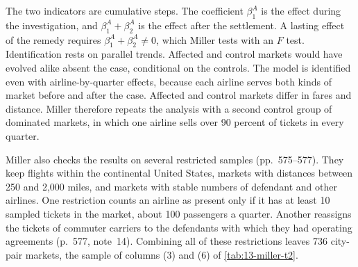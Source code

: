 The two indicators are cumulative steps. The coefficient $\beta^{A}_1$ is the effect during the investigation, and
$\beta^{A}_1 + \beta^{A}_2$ is the effect after the settlement. A lasting effect of the remedy requires
$\beta^{A}_1 + \beta^{A}_2 \neq 0$, which Miller tests with an $F$ test. Identification rests on parallel trends.
Affected and control markets would have evolved alike absent the case, conditional on the controls. The model is
identified even with airline-by-quarter effects, because each airline serves both kinds of market before and after
the case. Affected and control markets differ in fares and distance. Miller therefore repeats the analysis with a second
control group of dominated markets, in which one airline sells over 90 percent of tickets in every quarter.

Miller also checks the results on several restricted samples (pp.~575--577). They keep flights within the
continental United States, markets with distances between 250 and 2,000 miles, and markets with stable numbers of
defendant and other airlines. One restriction counts an airline as present only if it has at least 10 sampled
tickets in the market, about 100 passengers a quarter. Another reassigns the tickets of commuter carriers to the
defendants with which they had operating agreements (p.~577, note~14). Combining all of these restrictions leaves
736 city-pair markets, the sample of columns (3) and (6) of \cref{tab:13-miller-t2}.

